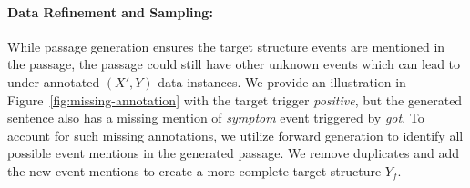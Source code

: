 \paragraph{Data Refinement and Sampling:}
While passage generation ensures the target structure events are mentioned in the passage, the passage could still have other unknown events which can lead to under-annotated $(X',Y)$ data instances.
We provide an illustration in Figure~\ref{fig:missing-annotation} with the target trigger \textit{positive}, but the generated sentence also has a missing mention of \textit{symptom} event triggered by \textit{got}.
To account for such missing annotations, we utilize forward generation to identify all possible event mentions in the generated passage.
We remove duplicates and add the new event mentions to create a more complete target structure $Y_f$.

